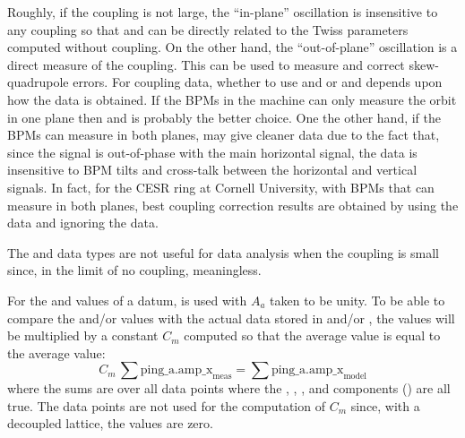 \begin{description}
{Roughly, if the coupling is not large, the ``in-plane''  oscillation is insensitive to any
coupling so that  and  can be directly related to the
Twiss parameters computed without coupling. On the other hand, the ``out-of-plane'' 
oscillation is a direct measure of the coupling. This can be used to measure and correct
skew-quadrupole errors. For coupling data, whether to use  and
 or  and  depends upon how
the data is obtained. If the BPMs in the machine can only measure the orbit in one plane then
 and  is probably the better choice. One the other hand,
if the BPMs can measure in both planes,  may give cleaner data due to the
fact that, since the  signal is out-of-phase with the main horizontal
signal, the  data is insensitive to BPM tilts and cross-talk between the
horizontal and vertical signals. In fact, for the CESR ring at Cornell University, with BPMs that
can measure in both planes, best coupling correction results are obtained by using the
 data and ignoring the  data.

The  and  data types are not useful for data analysis when the
coupling is small since, in the limit of no coupling,  meaningless.

For the  and  values of a datum,  is used with $A_a$ taken
to be unity. To be able to compare the  and/or  values with the
actual data stored in  and/or , the  values will be multiplied by a
constant $C_m$ computed so that the average  value is equal to the average
 value:
\begin{equation}
  C_m \, \sum \text{ping_a.amp_x}_\text{meas} = \sum \text{ping_a.amp_x}_\text{model}
\end{equation}
where the sums are over all  data points where the ,
, , and  components () are
all true. The  data points are not used for the computation of $C_m$
since, with a decoupled lattice, the  values are zero.

}
\end{description}
